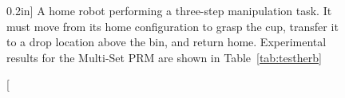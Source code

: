 \begin{figure}[t]
   \centering
   

   \caption[][0.2in]{
     A home robot performing a three-step manipulation task.
     It must move from its home configuration
     to grasp the cup,
     transfer it to a drop location above the bin,
     and return home.
     Experimental results for the Multi-Set PRM
     are shown in Table~\ref{tab:testherb}}
   \label{fig:testherb-problem}
\end{figure}

